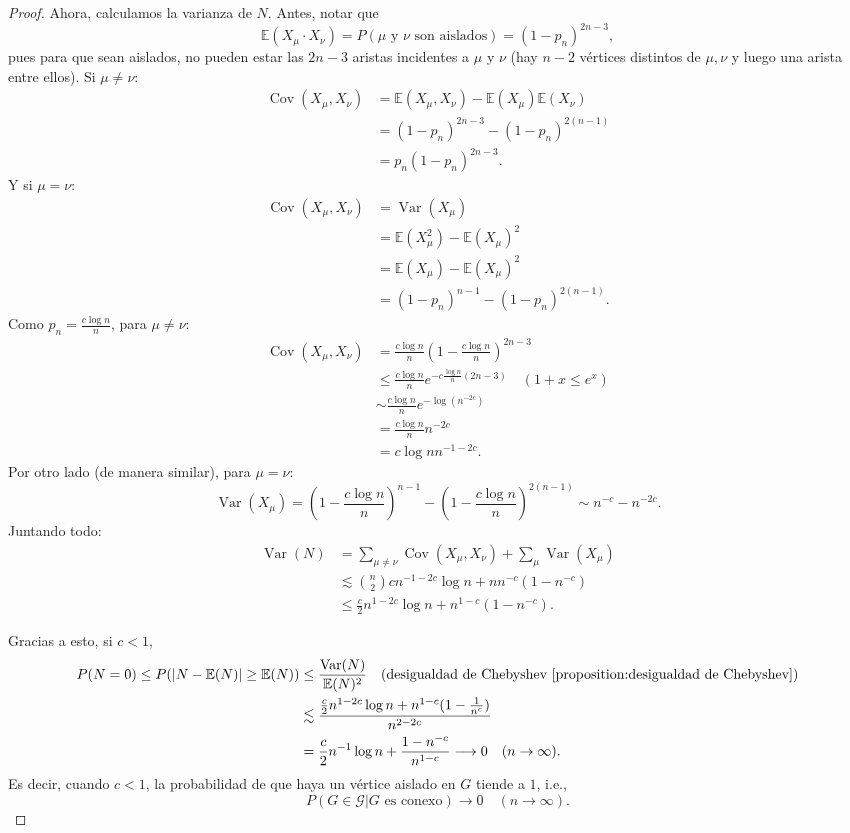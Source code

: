 \documentclass[12pt]{report}
\theoremstyle{plain}
\theoremstyle{definition}
\newcommand{\abs}[1]{\left \vert #1 \right \vert}
\begin{document}
\begin{proof}
Ahora, calculamos la varianza de $N$. Antes, notar que
\[
    \mathbb{E} (X_\mu \cdot X_\nu) = P (\mu \text{ y } \nu \text{ son aislados}) = (1-p_n)^{2n-3},
\]
pues para que sean aislados, no pueden estar las $2n-3$ aristas incidentes a $\mu$ y $\nu$ (hay $n-2$ vértices distintos de $\mu, \nu$ y luego una arista entre ellos). Si $\mu \neq \nu$:
\begin{align*}
\operatorname{Cov} (X_\mu, X_\nu) &= \mathbb{E} (X_\mu, X_\nu) - \mathbb{E} (X_\mu) \mathbb{E} (X_\nu) \\
&= (1-p_n)^{2n-3} - (1-p_n)^{2(n-1)} \\
&= p_n (1-p_n)^{2n-3}.
\end{align*}
Y si $\mu = \nu$:
\begin{align*}
\operatorname{Cov} (X_\mu , X_\nu) &= \operatorname{Var} (X_\mu) \\
&= \mathbb{E} (X_\mu^2) - \mathbb{E}(X_\mu)^2\\
&= \mathbb{E} (X_\mu) - \mathbb{E} (X_\mu)^2 \\
&= (1-p_n)^{n-1} - (1-p_n)^{2(n-1)}.
\end{align*}
Como $p_n = \frac{c \log n}{n}$, para $\mu \neq \nu$:
\begin{align*}
\operatorname{Cov} (X_\mu, X_\nu) &= \frac{c \log n}{n} (1 - \frac{c \log n}{n} )^{2n - 3 } \\
&\leq \frac{c \log n}{n} e^{-c \frac{\log n}{n} (2n-3)}  \quad (1 + x \leq e^x) \\
&\sim \frac{c \log n}{n} e^{- \log (n^{-2c})} \\
&= \frac{c\log n}{n} n^{-2 c} \\
&= c \log n n^{-1 - 2 c}.
\end{align*}
Por otro lado (de manera similar), para $\mu = \nu$:
\[
    \operatorname{Var} (X_\mu) = (1- \frac{c\log n}{n})^{n-1} - (1- \frac{c \log n }{n})^{2(n-1)} \sim n^{-c} - n^{-2c}.
\]
Juntando todo:
\begin{align*}
\operatorname{Var} (N) &= \sum_{\mu \neq \nu} \operatorname{Cov} (X_\mu, X_\nu) + \sum_{\mu} \operatorname{Var} (X_\mu) \\
&\lesssim \binom n 2 cn^{-1 -2 c} \log n + n n^{-c} (1- n^{-c}) \\
&\leq \frac c 2 n^{1-2c} \log n + n^{1-c} (1-n^{-c}).
\end{align*}

Gracias a esto, si $c < 1$,
\begin{align*}
P(N = 0) \leq P(\abs{N - \mathbb{E} (N)} \geq \mathbb{E} (N)) &\leq \frac{\operatorname{Var} (N)}{\mathbb{E} (N)^2} \quad (\text{desigualdad de Chebyshev \ref{proposition:desigualdad de Chebyshev}}) \\
&\lesssim \frac{\frac c 2 n^{1-2c} \log n + n^{1-c} (1- \frac 1 {n^c})}{n^{2-2c}} \\
&= \frac{c}{2} n^{-1} \log n + \frac {1 - n^{-c}}{n^{1-c}} \longrightarrow 0 \quad (n \to \infty).
\end{align*}
Es decir, cuando $c < 1$, la probabilidad de que haya un vértice aislado en $G$ tiende a $1$, i.e.,
\[
    P ( G \in \mathcal G | G \text{ es conexo}) \longrightarrow 0 \quad (n \to \infty).
\]


\end{proof}
\end{document}
